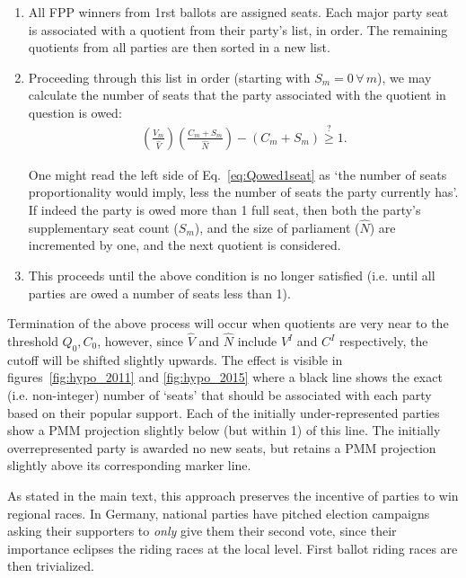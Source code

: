 \documentclass[DIV=calc, paper=a4, fontsize=11pt, twocolumn]{scrartcl}	 %
\begin{document}
\begin{enumerate}
\item All FPP winners from 1rst ballots are assigned seats. 
Each major party seat is associated with a quotient from their party's list, in order. The remaining quotients from all parties are then sorted in a new list.

\item Proceeding through this list in order (starting with $S_m=0 \, \forall \, m$), we may calculate the number of seats that the party associated with the quotient in question is owed:
\begin{align}
\left(\frac{V_m}{\hat{V}}\right)\left(\frac{C_m+S_m}{\hat{N}}\right)-(C_m+S_m)\stackrel{?}{\ge} 1.
\label{eq:Qowed1seat}
\end{align} 

One might read the left side of Eq.~\ref{eq:Qowed1seat} as `the number of seats proportionality would imply, less the number of seats the party currently has'.
If indeed the party is owed more than 1 full seat, then both the party's supplementary seat count ($S_m$), and the size of parliament ($\hat{N}$) are incremented by one, and the next quotient is considered. 

\item This proceeds until the above condition is no longer satisfied (i.e. until all parties are owed a number of seats less than 1). 
\end{enumerate}

Termination of the above process will occur when quotients are very near to the threshold $Q_0,C_0$, however, since $\hat{V}$ and $\hat{N}$ include $V^I$ and $C^I$ respectively, the cutoff will be shifted slightly upwards. The effect is visible in figures~\ref{fig:hypo_2011} and \ref{fig:hypo_2015} where a black line shows the exact (i.e. non-integer) number of `seats' that should be associated with each party based on their popular support. Each of the initially under-represented parties show a PMM projection slightly below (but within 1) of this line. The initially overrepresented party is awarded no new seats, but retains a PMM projection slightly above its corresponding marker line.

As stated in the main text, this approach preserves the incentive of parties to win regional races. In Germany, national parties have pitched election campaigns asking their supporters to \emph{only} give them their second vote, since their importance eclipses the riding races at the local level. First ballot riding races are then trivialized. 
\end{document}

